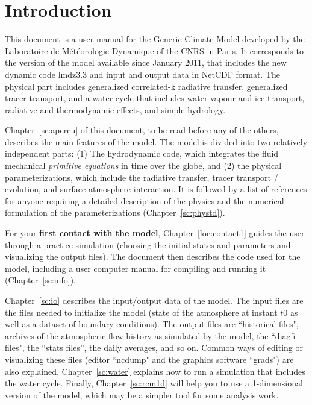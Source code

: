\chapter{Introduction}

This document is a user manual for the Generic Climate Model
developed by the Laboratoire de M\'et\'eorologie
Dynamique of the CNRS in Paris.
It corresponds to the version of the model available since January 2011,
that includes the new dynamic code lmdz3.3
and input and output data in NetCDF format.
The physical part includes generalized correlated-k radiative transfer,
generalized tracer transport, and a water cycle that includes water vapour and ice transport,
radiative and thermodynamic effects, and simple hydrology.

Chapter~\ref{sc:apercu} of this document, to be read before any of the others,
describes the main features of the model.
The model is divided into two relatively independent parts:
(1) The hydrodynamic code, which integrates the fluid mechanical \emph{primitive equations} in time
over the globe, and (2) the physical parameterizations, which include the radiative transfer, tracer transport / evolution,
and surface-atmosphere interaction. It is followed by a list of references for anyone requiring a detailed
description of the physics and the numerical formulation of the parameterizations (Chapter~\ref{sc:phystd}).

For your {\bf first contact with the model}, Chapter~\ref{loc:contact1} guides the user through a practice simulation
(choosing the initial states and parameters and  visualizing the output files). The document then describes the code used for the model, including a user computer manual for compiling and running it (Chapter~\ref{sc:info}).

Chapter~\ref{sc:io} describes the input/output data of the model. The input files are the files needed to initialize the model (state of the atmosphere at instant $t0$ as well as a dataset of boundary conditions). The output files are ``historical files", archives of the atmospheric flow history as simulated by the model, the ``diagfi files", the ``stats files'', the daily averages, and so on. Common ways of editing or visualizing these files (editor ``ncdump" and the graphics software ``grads") are also explained.  Chapter~\ref{sc:water} explains how to run a simulation that includes the water cycle. Finally, Chapter~\ref{sc:rcm1d} will help you to use a 1-dimensional version of the model, which may be a simpler tool for some analysis work.
